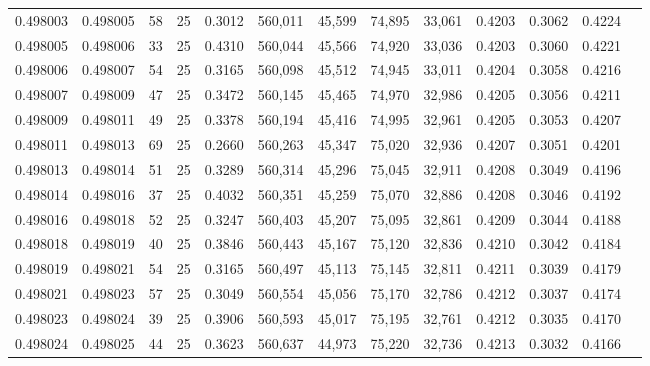 \begin{tabular}{rrrrrrrrrrrrr}
0.498003 & 0.498005 &    58 &  25 &                                     0.3012 & 560,011 &  45,599 &  74,895 &  33,061 & 0.4203 & 0.3062 & 0.4224 \\
0.498005 & 0.498006 &    33 &  25 &                                     0.4310 & 560,044 &  45,566 &  74,920 &  33,036 & 0.4203 & 0.3060 & 0.4221 \\
0.498006 & 0.498007 &    54 &  25 &                                     0.3165 & 560,098 &  45,512 &  74,945 &  33,011 & 0.4204 & 0.3058 & 0.4216 \\
0.498007 & 0.498009 &    47 &  25 &                                     0.3472 & 560,145 &  45,465 &  74,970 &  32,986 & 0.4205 & 0.3056 & 0.4211 \\
0.498009 & 0.498011 &    49 &  25 &                                     0.3378 & 560,194 &  45,416 &  74,995 &  32,961 & 0.4205 & 0.3053 & 0.4207 \\
0.498011 & 0.498013 &    69 &  25 &                                     0.2660 & 560,263 &  45,347 &  75,020 &  32,936 & 0.4207 & 0.3051 & 0.4201 \\
0.498013 & 0.498014 &    51 &  25 &                                     0.3289 & 560,314 &  45,296 &  75,045 &  32,911 & 0.4208 & 0.3049 & 0.4196 \\
0.498014 & 0.498016 &    37 &  25 &                                     0.4032 & 560,351 &  45,259 &  75,070 &  32,886 & 0.4208 & 0.3046 & 0.4192 \\
0.498016 & 0.498018 &    52 &  25 &                                     0.3247 & 560,403 &  45,207 &  75,095 &  32,861 & 0.4209 & 0.3044 & 0.4188 \\
0.498018 & 0.498019 &    40 &  25 &                                     0.3846 & 560,443 &  45,167 &  75,120 &  32,836 & 0.4210 & 0.3042 & 0.4184 \\
0.498019 & 0.498021 &    54 &  25 &                                     0.3165 & 560,497 &  45,113 &  75,145 &  32,811 & 0.4211 & 0.3039 & 0.4179 \\
0.498021 & 0.498023 &    57 &  25 &                                     0.3049 & 560,554 &  45,056 &  75,170 &  32,786 & 0.4212 & 0.3037 & 0.4174 \\
0.498023 & 0.498024 &    39 &  25 &                                     0.3906 & 560,593 &  45,017 &  75,195 &  32,761 & 0.4212 & 0.3035 & 0.4170 \\
0.498024 & 0.498025 &    44 &  25 &                                     0.3623 & 560,637 &  44,973 &  75,220 &  32,736 & 0.4213 & 0.3032 & 0.4166 \\

\end{tabular}
